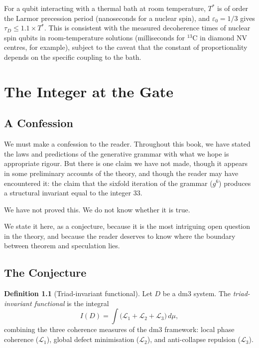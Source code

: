 \documentclass[12pt, oneside]{book}
\theoremstyle{plain}
\theoremstyle{definition}
\newtheorem{definition}{Definition}[chapter]
\theoremstyle{remark}
\begin{document}
For a qubit interacting with a thermal bath at room temperature,
$T^*$ is of order the Larmor precession period (nanoseconds
for a nuclear spin), and $\varepsilon_0 = 1/3$ gives
$\tau_D \leq 1.1 \times T^*$. This is consistent with the
measured decoherence times of nuclear spin qubits in
room-temperature solutions (milliseconds for $^{13}$C in
diamond NV centres, for example), subject to the caveat that
the constant of proportionality depends on the specific
coupling to the bath.

\chapter{The Integer at the Gate}
\label{ch:integer}

\section{A Confession}

We must make a confession to the reader. Throughout this book,
we have stated the laws and predictions of the generative grammar
with what we hope is appropriate rigour. But there is one claim
we have not made, though it appears in some preliminary accounts
of the theory, and though the reader may have encountered it:
the claim that the sixfold iteration of the grammar ($g^6$)
produces a structural invariant equal to the integer 33.

We have not proved this. We do not know whether it is true.

We state it here, as a conjecture, because it is the most
intriguing open question in the theory, and because the reader
deserves to know where the boundary between theorem and
speculation lies.

\section{The Conjecture}

\begin{definition}[Triad-invariant functional]
Let $D$ be a dm3 system. The \emph{triad-invariant functional}
is the integral
\[
I(D) = \int \bigl(\mathcal{L}_1 + \mathcal{L}_2 + \mathcal{L}_3\bigr)
\, d\mu,
\]
combining the three coherence measures of the dm3 framework:
local phase coherence ($\mathcal{L}_1$), global defect
minimisation ($\mathcal{L}_2$), and anti-collapse repulsion
($\mathcal{L}_3$).
\end{definition}
\end{document}
